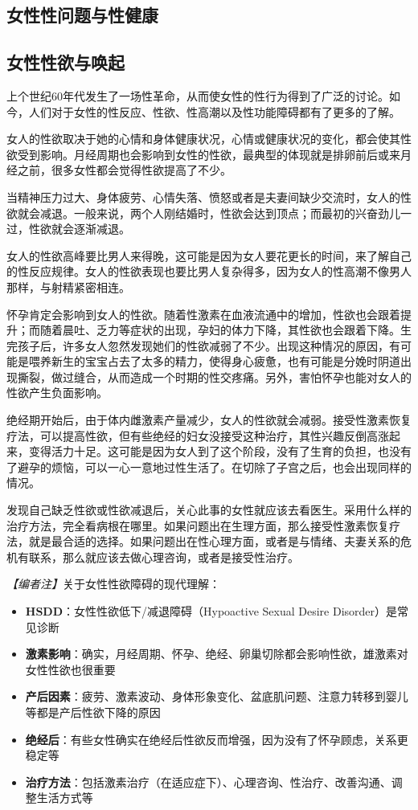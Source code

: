 \begin{enumerate}
\chapter{女性性问题与性健康}

\section{女性性欲与唤起}

上个世纪60年代发生了一场性革命，从而使女性的性行为得到了广泛的讨论。如今，人们对于女性的性反应、性欲、性高潮以及性功能障碍都有了更多的了解。

女人的性欲取决于她的心情和身体健康状况，心情或健康状况的变化，都会使其性欲受到影响。月经周期也会影响到女性的性欲，最典型的体现就是排卵前后或来月经之前，很多女性都会觉得性欲提高了不少。

当精神压力过大、身体疲劳、心情失落、愤怒或者是夫妻间缺少交流时，女人的性欲就会减退。一般来说，两个人刚结婚时，性欲会达到顶点；而最初的兴奋劲儿一过，性欲就会逐渐减退。

女人的性欲高峰要比男人来得晚，这可能是因为女人要花更长的时间，来了解自己的性反应规律。女人的性欲表现也要比男人复杂得多，因为女人的性高潮不像男人那样，与射精紧密相连。

怀孕肯定会影响到女人的性欲。随着性激素在血液流通中的增加，性欲也会跟着提升；而随着晨吐、乏力等症状的出现，孕妇的体力下降，其性欲也会跟着下降。生完孩子后，许多女人忽然发现她们的性欲减弱了不少。出现这种情况的原因，有可能是喂养新生的宝宝占去了太多的精力，使得身心疲惫，也有可能是分娩时阴道出现撕裂，做过缝合，从而造成一个时期的性交疼痛。另外，害怕怀孕也能对女人的性欲产生负面影响。

绝经期开始后，由于体内雌激素产量减少，女人的性欲就会减弱。接受性激素恢复疗法，可以提高性欲，但有些绝经的妇女没接受这种治疗，其性兴趣反倒高涨起来，变得活力十足。这可能是因为女人到了这个阶段，没有了生育的负担，也没有了避孕的烦恼，可以一心一意地过性生活了。在切除了子宫之后，也会出现同样的情况。

发现自己缺乏性欲或性欲减退后，关心此事的女性就应该去看医生。采用什么样的治疗方法，完全看病根在哪里。如果问题出在生理方面，那么接受性激素恢复疗法，就是最合适的选择。如果问题出在性心理方面，或者是与情绪、夫妻关系的危机有联系，那么就应该去做心理咨询，或者是接受性治疗。

\noindent\textit{【编者注】}关于女性性欲障碍的现代理解：
\begin{itemize}
	\item \textbf{HSDD}：女性性欲低下/减退障碍（Hypoactive Sexual Desire Disorder）是常见诊断
	\item \textbf{激素影响}：确实，月经周期、怀孕、绝经、卵巢切除都会影响性欲，雄激素对女性性欲也很重要
	\item \textbf{产后因素}：疲劳、激素波动、身体形象变化、盆底肌问题、注意力转移到婴儿等都是产后性欲下降的原因
	\item \textbf{绝经后}：有些女性确实在绝经后性欲反而增强，因为没有了怀孕顾虑，关系更稳定等
	\item \textbf{治疗方法}：包括激素治疗（在适应症下）、心理咨询、性治疗、改善沟通、调整生活方式等
\end{itemize}


\end{enumerate}
